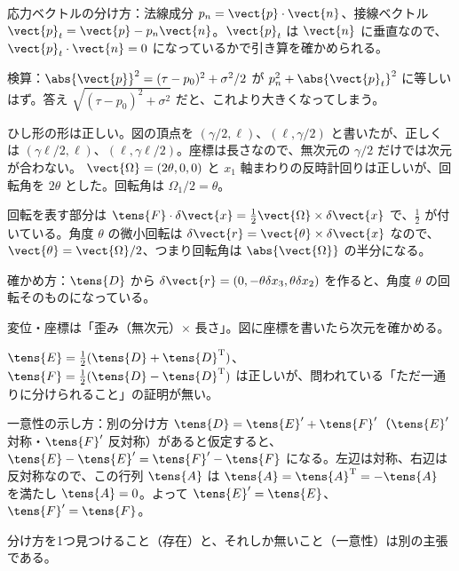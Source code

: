 \begin{rikai}
  \item 応力ベクトルの分け方：法線成分 $p_{n}=\vect{p}\cdot\vect{n}$、接線ベクトル $\vect{p}_{t}=\vect{p}-p_{n}\vect{n}$。$\vect{p}_{t}$ は $\vect{n}$ に垂直なので、$\vect{p}_{t}\cdot\vect{n}=0$ になっているかで引き算を確かめられる。
  \item 検算：$\abs{\vect{p}}^{2}=(\tau-p_{0})^{2}+\sigma^{2}/2$ が $p_{n}^{2}+\abs{\vect{p}_{t}}^{2}$ に等しいはず。答え $\sqrt{(\tau-p_{0})^{2}+\sigma^{2}}$ だと、これより大きくなってしまう。
\end{rikai}
\begin{kotaeran}
   ひし形の形は正しい。図の頂点を $(\gamma/2,\ell)$、$(\ell,\gamma/2)$ と書いたが、正しくは $(\gamma\ell/2,\ell)$、$(\ell,\gamma\ell/2)$。座標は長さなので、無次元の $\gamma/2$ だけでは次元が合わない。
   $\vect{\Omega}=(2\theta,0,0)$ と $x_{1}$ 軸まわりの反時計回りは正しいが、回転角を $2\theta$ とした。回転角は $\Omega_{1}/2=\theta$。
\end{kotaeran}
\begin{rikai}
  \item 回転を表す部分は $\tens{F}\cdot\delta\vect{x}=\frac{1}{2}\vect{\Omega}\times\delta\vect{x}$ で、$\frac{1}{2}$ が付いている。角度 $\theta$ の微小回転は $\delta\vect{r}=\vect{\theta}\times\delta\vect{x}$ なので、$\vect{\theta}=\vect{\Omega}/2$、つまり回転角は $\abs{\vect{\Omega}}$ の半分になる。
  \item 確かめ方：$\tens{D}$ から $\delta\vect{r}=(0,-\theta\delta x_{3},\theta\delta x_{2})$ を作ると、角度 $\theta$ の回転そのものになっている。
  \item 変位・座標は「歪み（無次元）$\times$ 長さ」。図に座標を書いたら次元を確かめる。
\end{rikai}
\begin{kotaeran}
   $\tens{E}=\frac{1}{2}(\tens{D}+\tens{D}^{\mathrm{T}})$、$\tens{F}=\frac{1}{2}(\tens{D}-\tens{D}^{\mathrm{T}})$ は正しいが、問われている「ただ一通りに分けられること」の証明が無い。
\end{kotaeran}
\begin{rikai}
  \item 一意性の示し方：別の分け方 $\tens{D}=\tens{E}'+\tens{F}'$（$\tens{E}'$ 対称・$\tens{F}'$ 反対称）があると仮定すると、$\tens{E}-\tens{E}'=\tens{F}'-\tens{F}$ になる。左辺は対称、右辺は反対称なので、この行列 $\tens{A}$ は $\tens{A}=\tens{A}^{\mathrm{T}}=-\tens{A}$ を満たし $\tens{A}=0$。よって $\tens{E}'=\tens{E}$、$\tens{F}'=\tens{F}$。
  \item 分け方を1つ見つけること（存在）と、それしか無いこと（一意性）は別の主張である。
\end{rikai}
